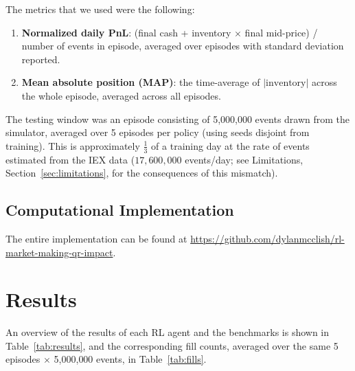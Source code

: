 \documentclass{article}
\begin{document}
The metrics that we used were the following:
\begin{enumerate}
  \item \textbf{Normalized daily PnL}: (final cash + inventory $\times$ final mid-price) / number of events in episode, averaged over episodes with standard deviation reported.
  \item \textbf{Mean absolute position (MAP)}: the time-average of $|\text{inventory}|$ across the whole episode, averaged across all episodes.
\end{enumerate}

The testing window was an episode consisting of 5{,}000{,}000 events drawn from the simulator, averaged over 5 episodes per policy (using seeds disjoint from training). This is approximately $\tfrac{1}{3}$ of a training day at the rate of events estimated from the IEX data ($17{,}600{,}000$ events/day; see Limitations, Section~\ref{sec:limitations}, for the consequences of this mismatch).

\subsection{Computational Implementation}

The entire implementation can be found at \url{https://github.com/dylanmcclish/rl-market-making-qr-impact}.

\section{Results}
\label{sec:results}

An overview of the results of each RL agent and the benchmarks is shown in Table~\ref{tab:results}, and the corresponding fill counts, averaged over the same 5 episodes $\times$ 5{,}000{,}000 events, in Table~\ref{tab:fills}.
\end{document}
